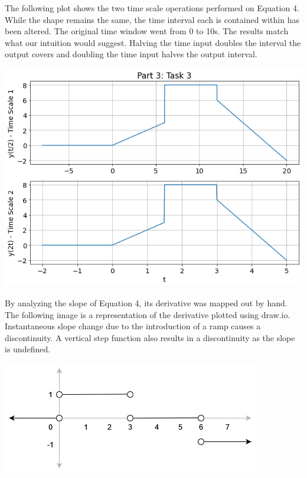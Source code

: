 \documentclass[12pt]{report}
\begin{document}
The following plot shows the two time scale operations performed on Equation 4. While the shape remains the same, the time interval each is contained within has been altered. The original time window went from 0 to 10s. The results match what our intuition would suggest. Halving the time input doubles the interval the output covers and doubling the time input halves the output interval. \\

\begin{center}
    \includegraphics[scale = 0.6]{Lab 2 - Plots/Part3-Task3.png}\\[1.0 cm]
\end{center}

By analyzing the slope of Equation 4, its derivative was mapped out by hand. The following image is a representation of the derivative plotted using draw.io. Instantaneous slope change due to the introduction of a ramp causes a discontinuity. A vertical step function also results in a discontinuity as the slope is undefined. \\

\begin{center}
    \includegraphics[scale = 0.61]{Lab 2 - Plots/Hand-drawn Derivative.jpg}\\[1.0 cm]
\end{center}
\end{document}
